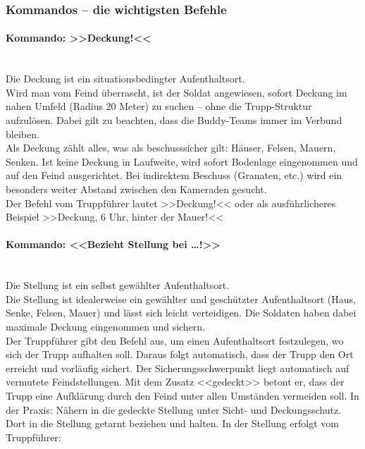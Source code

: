 
  
\subsubsection{Kommandos -- die wichtigsten Befehle}
\label{sec:kommando}
\paragraph*{Kommando: >>Deckung!<<}\hfil\\
	Die Deckung ist ein situationsbedingter Aufenthaltsort.\\ 
	Wird man vom Feind überrascht, ist der Soldat angewiesen, sofort Deckung im nahen Umfeld (Radius 20 Meter) zu suchen – ohne die Trupp-Struktur aufzulösen. Dabei gilt zu beachten, dass die Buddy-Teams immer im Verbund bleiben. \\
	Als Deckung zählt alles, was als beschusssicher gilt: Häuser, Felsen, Mauern, Senken. Ist keine Deckung in Laufweite, wird sofort Bodenlage eingenommen und auf den Feind ausgerichtet. Bei indirektem Beschuss (Granaten, etc.) wird ein besonders weiter Abstand zwischen den Kameraden gesucht.\\

	Der Befehl vom Truppführer lautet >>Deckung!<< oder als ausführlicheres Beispiel >>Deckung, 6 Uhr, hinter der Mauer!<<

\paragraph*{Kommando: <<Bezieht Stellung bei \dots!>>}\ \\
	Die Stellung ist ein selbst gewählter Aufenthaltsort. \\
	Die Stellung ist idealerweise ein gewählter und geschützter Aufenthaltsort (Haus, Senke, Felsen, Mauer) und lässt sich leicht verteidigen. Die Soldaten haben dabei maximale Deckung eingenommen und sichern. \\
	Der Truppführer gibt den Befehl aus, um einen Aufenthaltsort festzulegen, wo sich der Trupp aufhalten soll. Daraus folgt automatisch, dass der Trupp den Ort erreicht und vorläufig sichert. Der Sicherungsschwerpunkt liegt automatisch auf vermutete Feindstellungen. Mit dem Zusatz <<gedeckt>> betont er, dass der Trupp eine Aufklärung durch den Feind unter allen Umständen vermeiden soll. In der Praxis: Nähern in die gedeckte Stellung unter Sicht- und Deckungsschutz. Dort in die Stellung getarnt beziehen und halten. In der Stellung erfolgt vom Truppführer:

